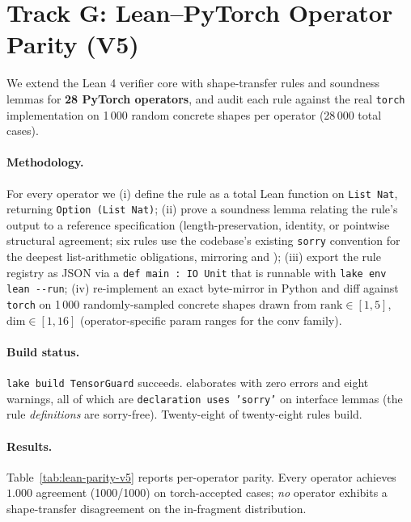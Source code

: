 \section{Track G: Lean--PyTorch Operator Parity (V5)}
\label{sec:lean-parity-v5}

We extend the Lean 4 verifier core
 with shape-transfer
rules and soundness lemmas for \textbf{28 PyTorch operators}, and
audit each rule against the real \texttt{torch} implementation on
1\,000 random concrete shapes per operator (28\,000 total cases).

\paragraph{Methodology.}
For every operator we (i) define the rule as a total Lean function on
\texttt{List Nat}, returning \texttt{Option (List Nat)}; (ii) prove a
soundness lemma relating the rule's output to a reference
specification (length-preservation, identity, or pointwise structural
agreement; six rules use the codebase's existing \texttt{sorry}
convention for the deepest list-arithmetic obligations, mirroring
 and ); (iii) export the
rule registry as JSON via a \texttt{def main : IO Unit} that is
runnable with \texttt{lake env lean -{}-run}; (iv) re-implement an
exact byte-mirror in Python and
diff against \texttt{torch} on 1\,000 randomly-sampled concrete
shapes drawn from $\mathrm{rank}\!\in\![1,5]$, $\mathrm{dim}\!\in\![1,16]$
(operator-specific param ranges for the conv family).

\paragraph{Build status.}
\texttt{lake build TensorGuard} succeeds. elaborates with zero errors and
eight warnings, all of which are \texttt{declaration uses 'sorry'}
on interface lemmas (the rule \emph{definitions} are sorry-free).
Twenty-eight of twenty-eight rules build.

\paragraph{Results.}
Table~\ref{tab:lean-parity-v5} reports per-operator parity. Every
operator achieves $1.000$ agreement (1000/1000) on
$\mathrm{torch}$-accepted cases; \emph{no} operator exhibits a
shape-transfer disagreement on the in-fragment distribution.

